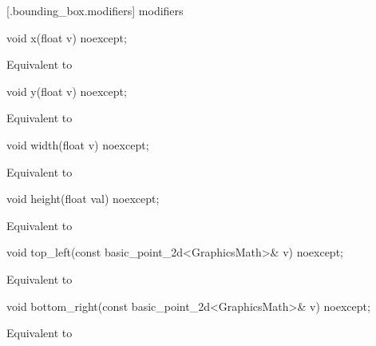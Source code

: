  [\iotwod.bounding_box.modifiers]{ modifiers}

%
\begin{itemdecl}
void x(float v) noexcept;
\end{itemdecl}
\begin{itemdescr}
\pnum
\effects
Equivalent to 
\end{itemdescr}

%
\begin{itemdecl}
void y(float v) noexcept;
\end{itemdecl}
\begin{itemdescr}
\pnum
\effects
Equivalent to 
\end{itemdescr}

%
\begin{itemdecl}
void width(float v) noexcept;
\end{itemdecl}
\begin{itemdescr}
\pnum
\effects
Equivalent to 
\end{itemdescr}

%
\begin{itemdecl}
void height(float val) noexcept;
\end{itemdecl}
\begin{itemdescr}
\pnum
\effects
Equivalent to 
\end{itemdescr}

%
\begin{itemdecl}
void top_left(const basic_point_2d<GraphicsMath>& v) noexcept;
\end{itemdecl}
\begin{itemdescr}
\pnum
\effects
Equivalent to 
\end{itemdescr}

%
\begin{itemdecl}
void bottom_right(const basic_point_2d<GraphicsMath>& v) noexcept;
\end{itemdecl}
\begin{itemdescr}
\pnum
\effects
Equivalent to 
\end{itemdescr}

